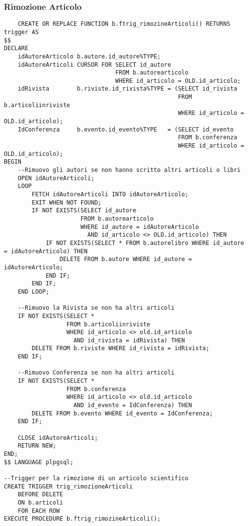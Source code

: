 \subsubsection{Rimozione Articolo}
\begin{lstlisting}
    CREATE OR REPLACE FUNCTION b.ftrig_rimozineArticoli() RETURNS trigger AS
$$
DECLARE
    idAutoreArticolo b.autore.id_autore%TYPE;
    idAutoreArticoli CURSOR FOR SELECT id_autore
                                FROM b.autorearticolo
                                WHERE id_articolo = OLD.id_articolo;
    idRivista        b.riviste.id_rivista%TYPE = (SELECT id_rivista
                                                  FROM b.articoliinriviste
                                                  WHERE id_articolo = OLD.id_articolo);
    IdConferenza     b.evento.id_evento%TYPE   = (SELECT id_evento
                                                  FROM b.conferenza
                                                  WHERE id_articolo = OLD.id_articolo);
BEGIN
    --Rimuovo gli autori se non hanno scritto altri articoli o libri
    OPEN idAutoreArticoli;
    LOOP
        FETCH idAutoreArticoli INTO idAutoreArticolo;
        EXIT WHEN NOT FOUND;
        IF NOT EXISTS(SELECT id_autore
                      FROM b.autorearticolo
                      WHERE id_autore = idAutoreArticolo
                        AND id_articolo <> OLD.id_articolo) THEN
            IF NOT EXISTS(SELECT * FROM b.autorelibro WHERE id_autore = idAutoreArticolo) THEN
                DELETE FROM b.autore WHERE id_autore = idAutoreArticolo;
            END IF;
        END IF;
    END LOOP;

    --Rimuovo la Rivista se non ha altri articoli
    IF NOT EXISTS(SELECT *
                  FROM b.articoliinriviste
                  WHERE id_articolo <> old.id_articolo
                    AND id_rivista = idRivista) THEN
        DELETE FROM b.riviste WHERE id_rivista = idRivista;
    END IF;

    --Rimuovo Conferenza se non ha altri articoli
    IF NOT EXISTS(SELECT *
                  FROM b.conferenza
                  WHERE id_articolo <> old.id_articolo
                    AND id_evento = IdConferenza) THEN
        DELETE FROM b.evento WHERE id_evento = IdConferenza;
    END IF;

    CLOSE idAutoreArticoli;
    RETURN NEW;
END;
$$ LANGUAGE plpgsql;

--Trigger per la rimozione di un articolo scientifico
CREATE TRIGGER trig_rimozioneArticoli
    BEFORE DELETE
    ON b.articoli
    FOR EACH ROW
EXECUTE PROCEDURE b.ftrig_rimozineArticoli();
\end{lstlisting}

